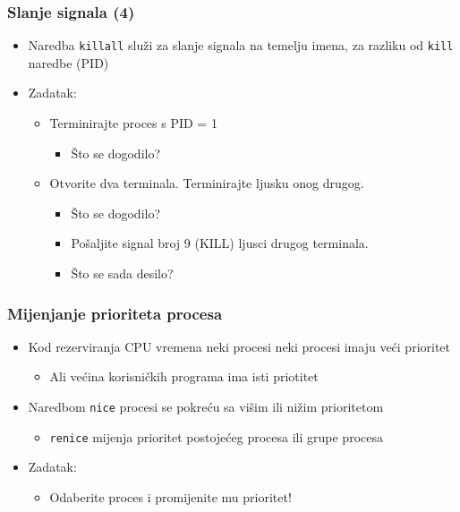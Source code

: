 \documentclass[table,usenames,dvipsnames]{beamer}
\newcommand{\shell}[1]{\texttt{#1}}
\begin{document}
\begin{frame}[t]
\frametitle{Slanje signala (4)}
\begin{itemize}
  \item Naredba \shell{killall} služi za slanje signala na temelju imena, za 
        razliku od \shell{kill} naredbe (PID)
  \item Zadatak:
  \begin{itemize}
    \item Terminirajte proces s PID = 1
    \begin{itemize}
      \item  Što se dogodilo?
    \end{itemize}
    \item Otvorite dva terminala. Terminirajte ljusku onog drugog.
    \begin{itemize}
      \item Što se dogodilo?
      \item Pošaljite signal broj 9 (KILL) ljusci drugog terminala.
      \item Što se sada desilo?
    \end{itemize}
  \end{itemize}
\end{itemize}
\end{frame}

\begin{frame}[t]
\frametitle{Mijenjanje prioriteta procesa}
\begin{itemize}
  \item Kod rezerviranja CPU vremena neki procesi neki procesi imaju veći 
        prioritet
  \begin{itemize}
    \item Ali većina korisničkih programa ima isti priotitet
  \end{itemize}
  \item Naredbom \shell{nice} procesi se pokreću sa višim ili nižim prioritetom
  \begin{itemize}
    \item \shell{renice} mijenja prioritet postojećeg procesa ili grupe procesa
  \end{itemize}
  \item Zadatak:
  \begin{itemize}
    \item Odaberite proces i promijenite mu prioritet!
  \end{itemize}
\end{itemize}
\end{frame}
\end{document}
